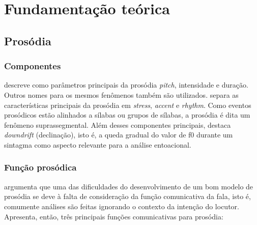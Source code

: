 
\chapter{Fundamentação teórica}

\section{Prosódia}
\subsection{Componentes}
 descreve como parâmetros principais da prosódia \emph{pitch},
intensidade e duração. Outros nomes para os mesmos fenômenos também são
utilizados.  separa as características principais da
prosódia em \emph{stress}, \emph{accent} e \emph{rhythm}. Como eventos prosódicos estão alinhados a sílabas ou grupos de sílabas, a prosódia é dita um fenômeno suprassegmental. Além desses componentes principais,  destaca
\emph{downdrift} (declinação), isto é, a queda gradual do valor de f0 durante um
sintagma como aspecto relevante para a análise entoacional.

\subsection{Função prosódica}
 argumenta que uma das dificuldades do desenvolvimento de
um bom modelo de prosódia se deve à falta de consideração da função
comunicativa da fala, isto é, comumente análises são feitas ignorando o contexto
da intenção do locutor. Apresenta, então, três principais funções comunicativas
para prosódia:

